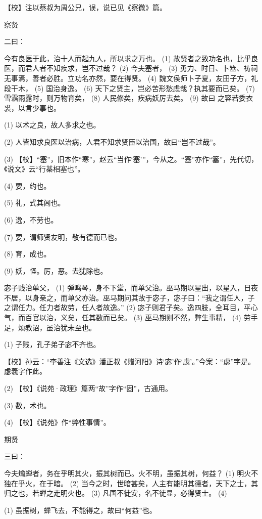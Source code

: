 \documentclass[12pt,UTF8]{ctexbook}
\begin{document}
【校】注以蔡叔为周公兄，误，说已见《察微》篇。





察贤


二曰：

今有良医于此，治十人而起九人，所以求之万也。 (1) 故贤者之致功名也，比乎良医，而君人者不知疾求，岂不过哉？ (2) 今夫塞者， (3) 勇力、时日、卜筮、祷祠无事焉，善者必胜。立功名亦然，要在得贤。 (4) 魏文侯师卜子夏，友田子方，礼段干木， (5) 国治身逸。 (6) 天下之贤主，岂必苦形愁虑哉？执其要而已矣。 (7) 雪霜雨露时，则万物育矣， (8) 人民修矣，疾病妖厉去矣。 (9) 故曰 之容若委衣裘，以言少事也。

(1) 以术之良，故人多求之也。

(2) 人皆知求良医以治病，人君不知求贤臣以治国，故曰“岂不过哉”。

(3) 【校】“塞”，旧本作“寒”，赵云“当作‘塞’”，今从之。“塞”亦作“簺”，先代切，《说文》云“行棊相塞也”。

(4) 要，约也。

(5) 礼，式其闾也。

(6) 逸，不劳也。

(7) 要，谓师贤友明，敬有德而已也。

(8) 育，成也。

(9) 妖，怪。厉，恶。去犹除也。

宓子贱治单父， (1) 弹鸣琴，身不下堂，而单父治。巫马期以星出，以星入，日夜不居，以身亲之，而单父亦治。巫马期问其故于宓子，宓子曰：“我之谓任人，子之谓任力。任力者故劳，任人者故逸。” (2) 宓子则君子矣。逸四肢，全耳目，平心气，而百官以治，义矣，任其数而已矣。 (3) 巫马期则不然，弊生事精， (4) 劳手足，烦教诏，虽治犹未至也。

(1) 子贱，孔子弟子宓不齐也。

【校】孙云：“李善注《文选》潘正叔《赠河阳》诗‘宓’作‘虙’。”今案：“虙”字是。虙羲字作此。

(2) 【校】《说苑·政理》篇两“故”字作“固”，古通用。

(3) 数，术也。

(4) 【校】《说苑》作“弊性事情”。





期贤


三曰：

今夫爚蝉者，务在乎明其火，振其树而已。火不明，虽振其树，何益？ (1) 明火不独在乎火，在于暗。 (2) 当今之时，世暗甚矣，人主有能明其德者，天下之士，其归之也，若蝉之走明火也。 (3) 凡国不徒安，名不徒显，必得贤士。 (4)

(1) 虽振树，蝉飞去，不能得之，故曰“何益”也。
\end{document}
